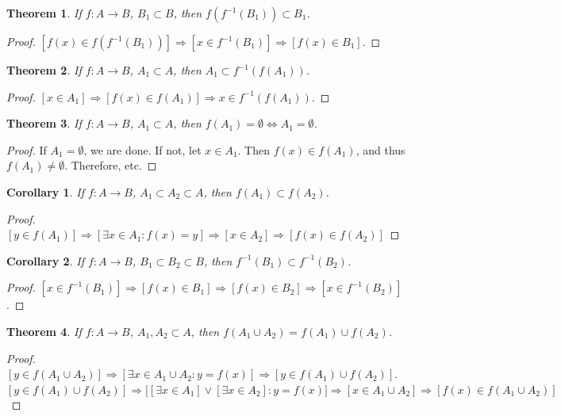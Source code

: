 \documentclass[12pt,oneside]{book}
\theoremstyle{mystyle}
\newtheorem{theorem}{Theorem}[section]
\newtheorem{corollary}{Corollary}[section]
\begin{document}
\begin{theorem}
If $f:A\rightarrow B$, $B_1\subset B$, then $f(f^{-1}(B_1))\subset B_1$.
\end{theorem}
\begin{proof}
$[f(x)\in f(f^{-1}(B_1))]\Rightarrow [x\in f^{-1}(B_1)]\Rightarrow [f(x)\in B_1]$.
\end{proof}

\begin{theorem}
If $f:A\rightarrow B$, $A_1\subset A$, then $A_1\subset f^{-1}(f(A_1))$.
\end{theorem}
\begin{proof}
$[x\in A_1]\Rightarrow [f(x) \in f(A_1)]\Rightarrow x\in f^{-1}(f(A_1))$.
\end{proof}

\begin{theorem}
If $f:A\rightarrow B$, $A_1\subset A$, then $f(A_1) = \emptyset \Leftrightarrow A_1 = \emptyset$.
\end{theorem}
\begin{proof}
If $A_1 = \emptyset$, we are done. If not, let $x\in A_1$. Then $f(x)\in f(A_1)$, and thus $f(A_1)\ne \emptyset$. Therefore, etc.
\end{proof}

\begin{corollary}
If $f:A\rightarrow B$, $A_1\subset A_2\subset A$, then $f(A_1)\subset f(A_2)$.
\end{corollary}
\begin{proof}
$[y\in f(A_1)]\Rightarrow[\exists x\in A_1:f(x)=y]\Rightarrow [x\in A_2] \Rightarrow [f(x)\in f(A_2)]$
\end{proof}

\begin{corollary}
If $f:A\rightarrow B$, $B_1\subset B_2\subset B$, then $f^{-1}(B_1)\subset f^{-1}(B_2)$.
\end{corollary}
\begin{proof}
$[x\in f^{-1}(B_1)] \Rightarrow [f(x) \in B_1] \Rightarrow [f(x) \in B_2]\Rightarrow [x\in f^{-1}(B_2)]$.
\end{proof}

\begin{theorem}
If $f:A\rightarrow B$, $A_1,A_2\subset A$, then $f(A_1 \cup A_2) = f(A_1)\cup f(A_2)$.
\end{theorem}
\begin{proof}
$[y\in f(A_1\cup A_2)]\Rightarrow [\exists x\in A_1 \cup A_2:y=f(x)]\Rightarrow [y \in f(A_1)\cup f(A_2)]$. $[y\in f(A_1)\cup f(A_2)]\Rightarrow \big[[\exists x\in A_1] \lor [\exists x\in A_2]: y=f(x)\big]\Rightarrow [x\in A_1\cup A_2]\Rightarrow [f(x)\in f(A_1\cup A_2)]$
\end{proof}
\end{document}
